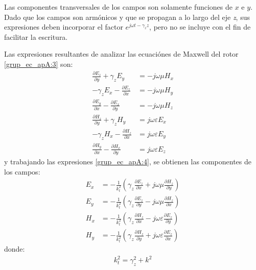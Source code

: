 Las componentes transversales de los campos son solamente funciones de $x$ e $y$. Dado que los campos son armónicos y que se propagan a lo largo del eje \emph{z}, sus expresiones deben incorporar el factor $e^{j\omega t - \gamma_zz}$, pero no se incluye con el fin de facilitar la escritura.

Las expresiones resultantes de analizar las ecuaciónes de Maxwell del rotor \eqref{grup_ec_apA:3} son:
\begin{subequations}
\label{grup_ec_apA:4}
\begin{align}
\frac{\partial E_z}{\partial y} + \gamma_z E_y &= - j\omega{\mu}H_x
\label{ec_apA:17}\\
- \gamma_z E_x - \frac{\partial E_z}{\partial x} &= - j\omega{\mu}H_y
\label{ec_apA:18}\\
\frac{\partial E_y}{\partial x} - \frac{\partial E_x}{\partial y} &= - j\omega{\mu}H_z
\label{ec_apA:19}\\
\frac{\partial H_z}{\partial y} + \gamma_z H_y &= j\omega{\varepsilon}E_x
\label{ec_apA:20}\\
- \gamma_z H_x - \frac{\partial H_z}{\partial x} &= j\omega{\varepsilon}E_y
\label{ec_apA:21}\\
\frac{\partial H_y}{\partial x} - \frac{\partial H_x}{\partial y} &= j\omega{\varepsilon}E_z
\label{ec_apA:22}
\end{align}
\end{subequations}
y trabajando las expresiones \eqref{grup_ec_apA:4}, se obtienen las componentes de los campos:
\begin{subequations}
\label{grup_ec_apA:5}
\begin{align}
E_x &= -\frac{1}{k^2_t}\left(\gamma_z\frac{\partial E_z}{\partial x} + j\omega\mu\frac{\partial H_z}{\partial y}\right)
\label{ec_apA:23}\\
E_y &= -\frac{1}{k^2_t}\left(\gamma_z\frac{\partial E_z}{\partial y} - j\omega\mu\frac{\partial H_z}{\partial x}\right)
\label{ec_apA:24}\\
H_x &= -\frac{1}{k^2_t}\left(\gamma_z\frac{\partial H_z}{\partial x} - j\omega\varepsilon\frac{\partial E_z}{\partial y}\right)
\label{ec_apA:25}\\
H_y &= -\frac{1}{k^2_t}\left(\gamma_z\frac{\partial H_z}{\partial y} + j\omega\varepsilon\frac{\partial E_z}{\partial x}\right)
\label{ec_apA:26}
\end{align}
\end{subequations}
donde:
\begin{align}
k^2_t = \gamma^2_z + k^2
\label{ec_apA:27}
\end{align}
